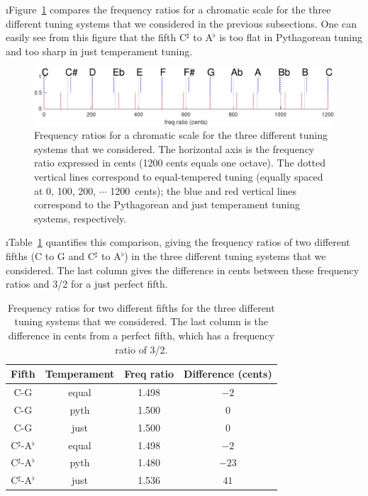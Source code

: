 \i Figure~\ref{f:comparetemperaments} compares
the frequency ratios for a chromatic scale for
the three different tuning systems that we considered
in the previous subsections. 
One can easily see from this figure
that the fifth C$^\sharp$ to A$^\flat$ is too flat in
Pythagorean tuning and too sharp in just temperament
tuning.
%
\begin{figure}[htbp]
\begin{center}
\includegraphics[width=.8\textwidth]{comparetemperaments.pdf}
\caption{Frequency ratios for a chromatic scale for 
the three different tuning systems that we considered.
The horizontal axis is the frequency ratio expressed in
cents (1200 cents equals one octave).
The dotted vertical lines correspond to equal-tempered
tuning (equally spaced at 0, 100, 200, $\cdots$ 1200~cents);
the blue and red vertical lines correspond to 
the Pythagorean and just temperament tuning systems, respectively.}
\label{f:comparetemperaments}
\end{center}
\end{figure}

\i Table~\ref{t:fifths} quantifies this comparison, 
giving the frequency ratios of two different fifths
(C to G and C$^\sharp$ to A$^\flat$) in the three different
tuning systems that we considered.
The last column gives the difference in cents between 
these frequency ratios and 3/2 for a just perfect fifth.
%
\begin{table}[htbp]
\begin{center}
\begin{tabular}{|c|c|c|c|}
\hline
Fifth & Temperament & Freq ratio & Difference (cents) \\
\hline
C-G & equal & 1.498 & $-2$ \\
C-G & pyth & 1.500 & $0$ \\
C-G & just & 1.500 & $0$ \\
C$^\sharp$-A$^\flat$ & equal & 1.498 & $-2$ \\
C$^\sharp$-A$^\flat$ & pyth & 1.480 & $-23$ \\
C$^\sharp$-A$^\flat$ & just & 1.536 & $41$ \\
\hline
\end{tabular}
\caption{Frequency ratios for two different fifths
for the three different tuning systems that we considered.
The last column is the difference in cents from
a perfect fifth, which has a frequency ratio of 3/2.}
\label{t:fifths}
\end{center}
\end{table}

